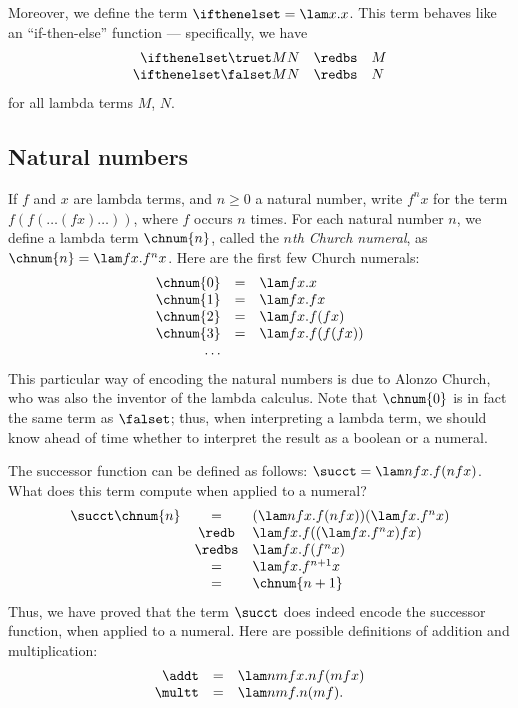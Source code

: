 \documentclass[12pt]{article}
\begin{document}
Moreover, we define the term $\ifthenelset=\lam x.x$. This term behaves
like an ``if-then-else'' function --- specifically, we have
\[ \begin{array}{rcl}
  \ifthenelset \truet M N &\redbs& M \\
  \ifthenelset \falset M N &\redbs& N \\
\end{array}
\]
for all lambda terms $M$, $N$.

\subsection{Natural numbers}\label{ssec-natural-numbers}

If $f$ and $x$ are lambda terms, and $n\geq 0$ a natural number, write
$f^nx$ for the term $f(f(\ldots(fx)\ldots))$, where $f$ occurs $n$
times.  For each natural number $n$, we define a lambda term
$\chnum{n}$, called the {\em $n$th Church numeral}, as $\chnum{n}=\lam
fx.f^nx$. Here are the first few Church numerals:
\[ \begin{array}{rcl}
  \chnum{0} &=& \lam fx.x \\
  \chnum{1} &=& \lam fx.fx \\
  \chnum{2} &=& \lam fx.f(fx) \\
  \chnum{3} &=& \lam fx.f(f(fx)) \\
  \ldots
\end{array}
\]
This particular way of encoding the natural numbers is due to Alonzo
Church, who was also the inventor of the lambda calculus.
Note that $\chnum{0}$ is in fact the same term as $\falset$; thus,
when interpreting a lambda term, we should know ahead of time whether
to interpret the result as a boolean or a numeral.

The successor function can be defined as follows: $\succt = \lam
nfx.f(nfx)$. What does this term compute when applied to a numeral?
\[ \begin{array}{rcl}
  \succt \chnum{n} &=& (\lam nfx.f(nfx))(\lam fx.f^nx) \\
  &\redb& \lam fx.f((\lam fx.f^nx)fx) \\
  &\redbs& \lam fx.f(f^nx) \\
  &=& \lam fx.f^{n+1}x \\
  &=& \chnum{n+1}
\end{array}
\]
Thus, we have proved that the term $\succt$ does indeed encode the
successor function, when applied to a numeral. Here are possible
definitions of addition and multiplication:
\[ \begin{array}{rcl}
  \addt &=& \lam nmfx.nf(mfx) \\
  \multt &=& \lam nmf.n(mf). 
\end{array}
\]
\end{document}

